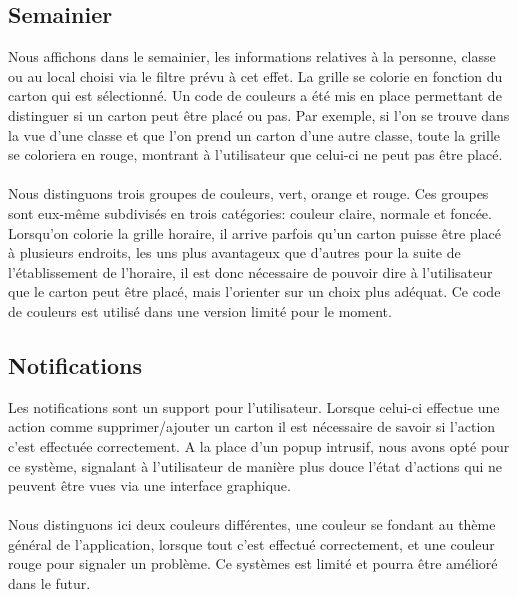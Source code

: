 \subsection{Semainier}
Nous affichons dans le semainier, les informations relatives à la personne, classe ou au local choisi via le filtre prévu à cet effet. La grille se colorie en fonction du carton qui est sélectionné. Un code de couleurs a été mis en place permettant de distinguer si un carton peut être placé ou pas. Par exemple, si l'on se trouve dans la vue d'une classe et que l'on prend un carton d'une autre classe, toute la grille se coloriera en rouge, montrant à l'utilisateur que celui-ci ne peut pas être placé.\\
\\
Nous distinguons trois groupes de couleurs, vert, orange et rouge. Ces groupes sont eux-même subdivisés en trois catégories: couleur claire, normale et foncée. Lorsqu'on colorie la grille horaire, il arrive parfois qu'un carton puisse être placé à plusieurs endroits, les uns plus avantageux que d'autres pour la suite de l'établissement de l'horaire, il est donc nécessaire de pouvoir dire à l'utilisateur que le carton peut être placé, mais l'orienter sur un choix plus adéquat. Ce code de couleurs est utilisé dans une version limité pour le moment.
\subsection{Notifications}
Les notifications sont un support pour l'utilisateur. Lorsque celui-ci effectue une action comme supprimer/ajouter un carton il est nécessaire de savoir si l'action c'est effectuée correctement. A la place d'un popup intrusif, nous avons opté pour ce système, signalant à l'utilisateur de manière plus douce l'état d'actions qui ne peuvent être vues via une interface graphique.\\
\\
Nous distinguons ici deux couleurs différentes, une couleur se fondant au thème général de l'application, lorsque tout c'est effectué correctement, et une couleur rouge pour signaler un problème. Ce systèmes est limité et pourra être amélioré dans le futur.

